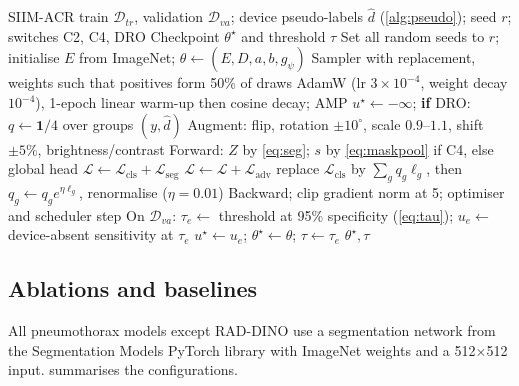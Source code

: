 \documentclass{ieeeaccess}
\begin{document}
\begin{algorithm}[!t]
\caption{Training one configuration with one seed (stages \emph{planb\_main\_a/b})}
\label{alg:train}
\begin{algorithmic}[1]
\Require SIIM-ACR train $\mathcal{D}_{tr}$, validation $\mathcal{D}_{va}$; device pseudo-labels $\hat d$ (\cref{alg:pseudo}); seed $r$; switches C2, C4, DRO
\Ensure Checkpoint $\theta^\star$ and threshold $\tau$
\State Set all random seeds to $r$; initialise $E$ from ImageNet; $\theta\gets(E,D,a,b,g_\psi)$
\State Sampler with replacement, weights such that positives form 50\% of draws
\State AdamW (lr $3\!\times\!10^{-4}$, weight decay $10^{-4}$), 1-epoch linear warm-up then cosine decay; AMP
\State $u^\star\gets-\infty$; \textbf{if} DRO: $q\gets\mathbf{1}/4$ over groups $(y,\hat d)$
    \State Augment: flip, rotation $\pm10^\circ$, scale $0.9$--$1.1$, shift $\pm5\%$, brightness/contrast
    \State Forward: $Z$ by \cref{eq:seg}; $s$ by \cref{eq:maskpool} if C4, else global head
    \State $\mathcal{L}\gets\mathcal{L}_{\text{cls}}+\mathcal{L}_{\text{seg}}$ 
     \State $\mathcal{L}\gets\mathcal{L}+\mathcal{L}_{\text{adv}}$  \label{line:adv}
    \EndIf
     \State replace $\mathcal{L}_{\text{cls}}$ by $\sum_g q_g\ell_g$, then $q_g\gets q_g e^{\eta\ell_g}$, renormalise ($\eta=0.01$) \label{line:dro}
    \EndIf
    \State Backward; clip gradient norm at 5; optimiser and scheduler step
  \EndFor
  \State On $\mathcal{D}_{va}$: $\tau_e\gets$ threshold at 95\% specificity (\cref{eq:tau}); $u_e\gets$ device-absent sensitivity at $\tau_e$
   \State $u^\star\gets u_e$; $\theta^\star\gets\theta$; $\tau\gets\tau_e$ \label{line:select}
  \EndIf
\EndFor
\State \Return $\theta^\star,\tau$
\end{algorithmic}
\end{algorithm}

\subsection{Ablations and baselines}
\label{sec:baselines}
All pneumothorax models except RAD-DINO use a segmentation network from the Segmentation Models PyTorch library \cite{iakubovskii2019smp} with ImageNet weights and a 512$\times$512 input.  summarises the configurations.
\end{document}
